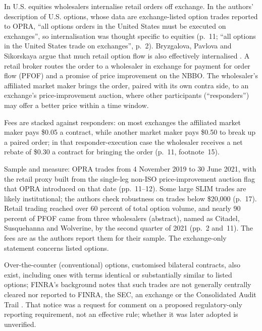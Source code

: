 \begin{qfmechanism}\label{mech:options-retail-wholesaler-routing}
 In U.S. equities wholesalers internalise retail orders off exchange. In the authors' description of U.S. options, whose data are exchange-listed option trades reported to OPRA, ``all options orders in the United States must be executed on exchanges'', so internalisation was thought specific to equities (p.~11; ``all options in the United States trade on exchanges'', p.~2). Bryzgalova, Pavlova and Sikorskaya argue that much retail option flow is also effectively internalised \citep[published version, p.~2]{ex-bryzgalova-pavlova-sikorskaya-2023}. A retail broker routes the order to a wholesaler in exchange for payment for order flow (PFOF) and a promise of price improvement on the NBBO. The wholesaler's affiliated market maker brings the order, paired with its own contra side, to an exchange's price-improvement auction, where other participants (``responders'') may offer a better price within a time window.

Fees are stacked against responders: on most exchanges the affiliated market maker pays \$0.05 a contract, while another market maker pays \$0.50 to break up a paired order; in that responder-execution case the wholesaler receives a net rebate of \$0.30 a contract for bringing the order (p.~11, footnote~15).

 Sample and measure: OPRA trades from 4 November 2019 to 30 June 2021, with the retail proxy built from the single-leg non-ISO price-improvement auction flag that OPRA introduced on that date (pp.~11--12). Some large SLIM trades are likely institutional; the authors check robustness on trades below \$20{,}000 (p.~17). Retail trading reached over 60 percent of total option volume, and nearly 90 percent of PFOF came from three wholesalers (abstract), named as Citadel, Susquehanna and Wolverine, by the second quarter of 2021 (pp.~2 and~11). The fees are as the authors report them for their sample. The exchange-only statement concerns listed options.

Over-the-counter (conventional) options, customised bilateral contracts, also exist, including ones with terms identical or substantially similar to listed options; FINRA's background notes that such trades are not generally centrally cleared nor reported to FINRA, the SEC, an exchange or the Consolidated Audit Trail \citep[Background and Discussion]{finra-rn-22-14}. That notice was a request for comment on a proposed regulatory-only reporting requirement, not an effective rule; whether it was later adopted is unverified.


\end{qfmechanism}
